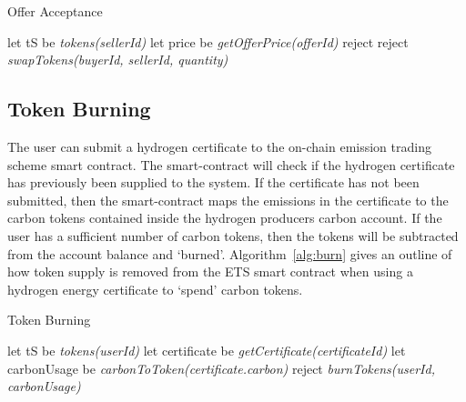 \begin{algorithm}[ht]
    \caption{Offer Acceptance}
    \begin{algorithmic}[1]
        \State let tS be \textit{tokens(sellerId)}
        \State let price be \textit{getOfferPrice(offerId)}
        reject
        \EndIf
        reject
        \EndIf
        \State \textit{swapTokens(buyerId, sellerId, quantity)}
        \EndProcedure
    \end{algorithmic}
    \label{alg:offer}
\end{algorithm}

\subsection{Token Burning}
The user can submit a hydrogen certificate to the
on-chain emission trading scheme smart contract. The smart-contract will
check if the hydrogen certificate
has previously been supplied to the system. If the
certificate has not been submitted, then the smart-contract
maps the emissions in the certificate to the carbon tokens
contained inside the hydrogen producers carbon account. If the
user has a sufficient number of carbon tokens, then the tokens
will be subtracted from the account balance and `burned'.
Algorithm~\ref{alg:burn} gives an outline of how token supply is
removed from the ETS smart contract when using a hydrogen energy
certificate to `spend' carbon tokens.

\begin{algorithm}[ht]
    \caption{Token Burning}
    \begin{algorithmic}[1]
        \State let tS be \textit{tokens(userId)}
        \State let certificate be \textit{getCertificate(certificateId)}
        \State let carbonUsage be \textit{carbonToToken(certificate.carbon)}
        reject
        \EndIf
        \State \textit{burnTokens(userId, carbonUsage)}
        \EndProcedure
    \end{algorithmic}
    \label{alg:burn}
\end{algorithm}

